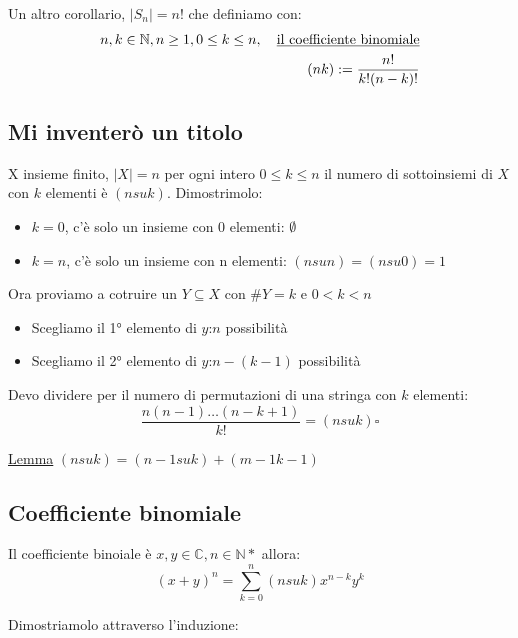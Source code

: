\documentclass{article}
\theoremstyle{definition}
\begin{document}
Un altro corollario, $|S_n| = n$! che definiamo con:
\begin{align*}
        n,k \in \mathbb{N}, n \ge 1, 0 \le k \le n, \quad \mbox{\underline{il coefficiente binomiale}} \\
        (n k) := \frac{n!}{k!(n-k)!}
\end{align*}




\subsection{Mi inventerò un titolo}
X insieme finito, $|X| = n$ per ogni intero $0 \le k \le n$ il numero di sottoinsiemi di $X$ con $k$ elementi è $(n su k)$.
Dimostrimolo:
\begin{itemize}
        \item $k=0$, c'è solo un insieme con 0 elementi: $\emptyset$
        \item $k=n$, c'è solo un insieme con n elementi: $(n su n) = (n su 0) = 1$
\end{itemize}

Ora proviamo a cotruire un $Y \subseteq X$ con $\#Y = k$ e $0 < k < n$ \par
\begin{itemize}
        \item Scegliamo il 1° elemento di $y$:$n$ possibilità
        \item Scegliamo il 2° elemento di $y$:$n-(k-1)$ possibilità
\end{itemize}

Devo dividere per il numero di permutazioni di una stringa con $k$ elementi:
\begin{equation*}
        \frac{n(n-1)\ldots(n-k+1)}{k!} = (n su k) \square
\end{equation*}

\underline{Lemma} $(n su k) = (n-1 su k) + (m-1 k-1)$ 



\subsection{Coefficiente binomiale}
Il coefficiente binoiale è $x,y \in \mathbb{C}, n \in \mathbb{N}*$ allora:
\begin{equation*}
        {(x+y)}^{n} = \sum_{k=0}^{n}(n su k)x^{n-k}y^k
\end{equation*}

Dimostriamolo attraverso l'induzione: \newline
{}
\end{document}
